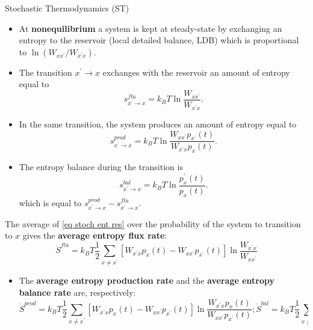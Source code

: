 \documentclass[final]{beamer}
\newlength{\colwidth}
\begin{document}
\begin{frame}[t]
\begin{columns}[t]
\begin{column}{\colwidth}
\begin{block}{Stochastic Thermodynamics (ST)}
\begin{itemize}
\item At {\bf nonequilibrium} a system is kept at steady-state by exchanging an entropy to the reservoir (local detailed balance, LDB) which is proportional to $\ln (W_{xx^\prime} / W_{x^\prime x})$\cite{10.21468/SciPostPhysLectNotes.32}.
\end{itemize}
\begin{itemize}
\justifying
\item The transition $x^\prime \rightarrow x$ exchanges with the reservoir an amount of entropy equal to
%
\begin{equation}
s^{flu}_{x^\prime \rightarrow x} = k_B T \ln \frac{W_{xx^\prime}}{W_{x^\prime x}}.
\label{eq stoch ent res}
\end{equation}
%
\item In the same transition, the system produces an amount of entropy equal to
%
\begin{equation*}
s^{prod}_{x^\prime \rightarrow x} = k_B T \ln \frac{W_{xx^\prime}p_{x^\prime}(t)}{W_{x^\prime x}p_x(t)}.
\label{eq stoch ent prod}
\end{equation*}
%
\item The entropy balance during the transition is
%
\begin{equation*}
s^{bal}_{x^\prime \rightarrow x} = k_B T \ln \frac{p_x^\prime(t)}{p_x(t)}.
\label{eq stoch ent bal}
\end{equation*}
%
which is equal to $s^{prod}_{x^\prime \rightarrow x} - s^{flu}_{x^\prime \rightarrow x}$.
\end{itemize}
The average of \eqref{eq stoch ent res} over the probability of the system to transition to $x$ gives the {\bf average entropy flux rate}\cite{peliti2021stochastic}:
%
\begin{equation*}
\dot{S}^{flu} = k_B T \frac{1}{2} \sum_{x \neq x^\prime} \left[ W_{x^\prime x} p_x(t) -  W_{x x^\prime}p_{x^\prime}(t) \right] \ln \frac{W_{x^\prime x}}{W_{xx^\prime}}
\end{equation*}
%
\begin{itemize}
\item The {\bf average entropy production rate} and the {\bf average entropy balance rate}\cite{Schnakenberg:1976aa} are, respectively:
%
\begin{subequations}
\begin{equation*}
\dot{S}^{prod}  = k_B T\frac{1}{2} \sum_{x \neq x^\prime} \left[ W_{x^\prime x} p_x(t) -  W_{x x^\prime}p_{x^\prime}(t) \right] \ln \frac{W_{x^\prime x} p_x(t)}{W_{xx^\prime}p_{x^\prime}(t)};
\end{equation*}
\begin{equation*}
 \dot{S}^{bal} = k_B T \frac{1}{2} \sum_{x \neq x^\prime} \left[ W_{x^\prime x} p_x(t) -  W_{x x^\prime}p_{x^\prime}(t) \right] \ln \frac{p_x(t)}{p_{x^\prime}(t)}.
\end{equation*}
\end{subequations}


\end{itemize}
\end{block}
\end{column}
\end{columns}
\end{frame}
\end{document}
